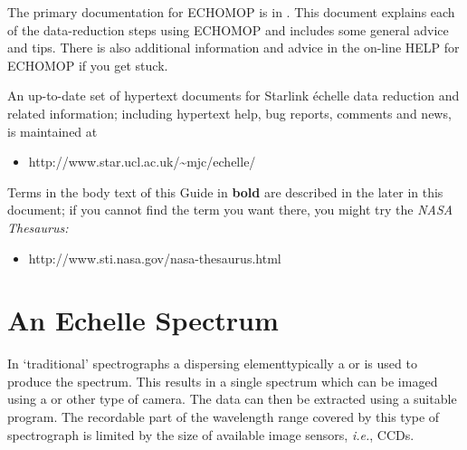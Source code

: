 The primary documentation for ECHOMOP is in \@.
This document explains each of the data-reduction steps using ECHOMOP and
includes some general advice and tips.
There is also additional information and advice in the on-line HELP for
ECHOMOP if you get stuck.

An up-to-date set of hypertext documents for Starlink \'{e}chelle data
reduction and related information; including hypertext help, bug
reports, comments and news, is maintained at

\begin{itemize}

\item {}
      {
      {http://www.star.ucl.ac.uk/\~{}mjc/echelle/}}

\end{itemize}

Terms in the body text of this Guide in {\bf bold} are described in the
 later in this document;
if you cannot find the term you want there, you might try the
{\sl NASA Thesaurus:}

\begin{itemize}

\item {}
      {
      {http://www.sti.nasa.gov/nasa-thesaurus.html}}

\end{itemize}


\section{\label{se_example_echelle}An Echelle
         Spectrum}

In `traditional' spectrographs a dispersing element\sgspec{---}{ - }typically a
 or
\sgspec{---}{ - }is used to produce the spectrum.
This results in a single spectrum which can be imaged using a
 or other
type of camera.  The data can then be extracted using a suitable
program.  The recordable part of the wavelength range covered by this type of
spectrograph is limited by the size of available image sensors,
{\em i.e.}, CCDs.

